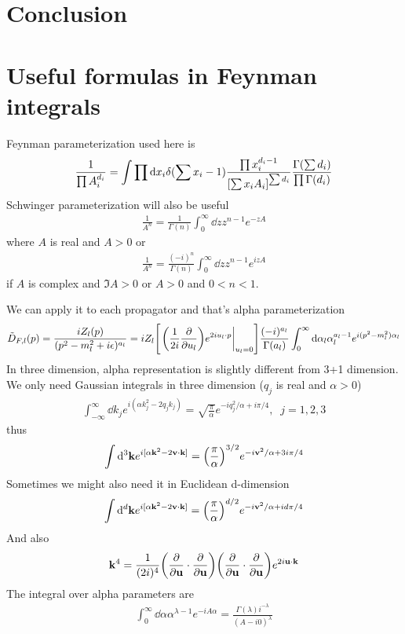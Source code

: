 \documentclass[aps,prd,preprint,showkeys,notitlepage,10pt]{revtex4-1}
\newcommand{\vbk}{\vb{k}}
\renewcommand{\a}{\alpha}
\newcommand{\la}{\lambda}
\begin{document}
\section{Conclusion}
\appendix

\section{Useful formulas in Feynman integrals}
Feynman parameterization used here is
\begin{align}
	\frac{1}{\prod A_i^{d_i}}=\int\prod \dd x_i \delta(\sum x_i-1)\frac{\prod x_i^{d_i-1}}{\bqty{\sum x_iA_i}^{\sum d_i}}\frac{\Gamma(\sum d_i)}{\prod\Gamma(d_i)}
	\label{FEYNMANPARA}
\end{align}
Schwinger parameterization will also be useful
\begin{align}
	\frac{1}{A^n}=\frac{1}{\Gamma{(n)}}\int_0^\infty\dd z z^{n-1}e^{-zA}
\end{align}
where $A$ is real and $A>0$ or
\begin{align}
	\frac{1}{A^n}=\frac{(-i)^{n}}{\Gamma{(n)}}\int_0^\infty\dd z z^{n-1}e^{izA}
\end{align}
if $A$ is complex and $\Im A>0$ or $A>0$ and $0<n<1$.

We can apply it to each propagator and that's alpha parameterization\cite{Smirnov2006}
\begin{align}
	\tilde D_{F,l}(p)=\frac{iZ_l(p)}{(p^2-m_l^2+i\epsilon)^{a_l}}=iZ_l\bqty{\eval{\pqty{\frac{1}{2i}\pdv{u_l}}e^{2iu_l\cdot p}}_{u_l=0}}\frac{(-i)^{a_l}}{\Gamma{(a_l)}}\int_0^{\infty}\dd \a_l \a_l^{a_l-1}e^{i(p^2-m_l^2)\a_l}
	\label{ALPHAPARA}
\end{align}
In three dimension, alpha representation is slightly different from 3+1 dimension. We only need Gaussian integrals in three dimension ($q_j$ is real and $\a>0$)
\begin{align}
	\int_{-\infty}^{\infty}\dd k_je^{i(\a k_j^2-2q_jk_j)}=\sqrt{\frac{\pi}{\a}}e^{-iq_j^2/\a+i\pi/4},\;\;j=1,2,3
\end{align}
thus
\begin{align}
	\int\dd^3\vbk e^{i[\a \vbk^2-2 \vb{v}\cdot \vbk]}=\pqty{\frac{\pi}{\a}}^{3/2}e^{-i\vb{v}^2/\a+3i\pi/4}
\end{align}
Sometimes we might also need it in Euclidean d-dimension
\begin{align}
	\int\dd^d\vbk e^{i[\a \vbk^2-2 \vb{v}\cdot \vbk]}=\pqty{\frac{\pi}{\a}}^{d/2}e^{-i\vb{v}^2/\a+id\pi/4}
\end{align}
And also
\begin{align*}
	\vbk^4=\frac{1}{(2i)^4}\pqty{\pdv{\vb{u}}\cdot\pdv{\vb{u}}}\pqty{\pdv{\vb{u}}\cdot\pdv{\vb{u}}}e^{2i\vb{u}\cdot\vbk}
\end{align*}
The integral over alpha parameters are
\begin{align*}
	\int_0^{\infty}\dd \a \a^{\la-1}e^{-i A \a}=\frac{\Gamma(\la)i^{-\la}}{(A-i0)^{\la}}
\end{align*}
\end{document}
